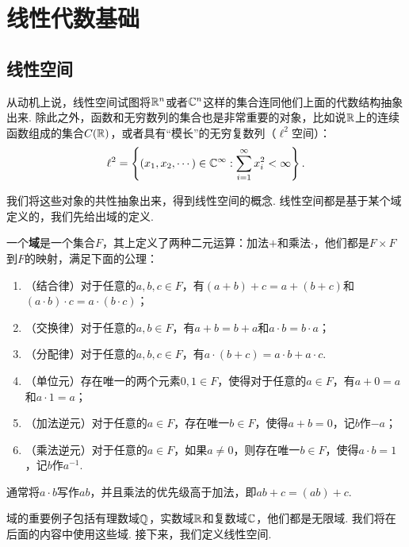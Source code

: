 \chapter{线性代数基础}\label{chap:linear-algebra}

\section{线性空间}

从动机上说，线性空间试图将$\mathbb{R}^n$或者$\mathbb{C}^n$这样的集合连同他们上面的代数结构抽象出来. 除此之外，函数和无穷数列的集合也是非常重要的对象，比如说$\mathbb{R}$上的连续函数组成的集合$C(\mathbb{R})$，或者具有“模长”的无穷复数列（$\ell^2$空间）：
\[\ell^2=\left\{(x_1,x_2,\cdots)\in\mathbb{C}^\infty:\sum_{i=1}^\infty x_i^2<\infty\right\}.\]

我们将这些对象的共性抽象出来，得到线性空间的概念. 线性空间都是基于某个域定义的，我们先给出域的定义. 

\begin{definition}[域]
一个\textbf{域}是一个集合$F$，其上定义了两种二元运算：加法$+$和乘法$\cdot$，他们都是$F\times F$到$F$的映射，满足下面的公理：
\begin{enumerate}
    \item （结合律）对于任意的$a,b,c\in F$，有$(a+b)+c=a+(b+c)$和$(a\cdot b)\cdot c=a\cdot (b\cdot c)$；
    \item （交换律）对于任意的$a,b\in F$，有$a+b=b+a$和$a\cdot b=b\cdot a$；
    \item（分配律）对于任意的$a,b,c\in F$，有$a\cdot(b+c)=a\cdot b+a\cdot c$. 
    \item （单位元）存在唯一的两个元素$0,1\in F$，使得对于任意的$a\in F$，有$a+0=a$和$a\cdot 1=a$；
    \item （加法逆元）对于任意的$a\in F$，存在唯一$b\in F$，使得$a+b=0$，记$b$作$-a$；
    \item （乘法逆元）对于任意的$a\in F$，如果$a\neq 0$，则存在唯一$b\in F$，使得$a\cdot b=1$，记$b$作$a^{-1}$.
\end{enumerate}
通常将$a\cdot b$写作$ab$，并且乘法的优先级高于加法，即$ab+c=(ab)+c$. 
\end{definition}

域的重要例子包括有理数域$\mathbb{Q}$，实数域$\mathbb{R}$和复数域$\mathbb{C}$，他们都是无限域. 我们将在后面的内容中使用这些域. 接下来，我们定义线性空间. 

